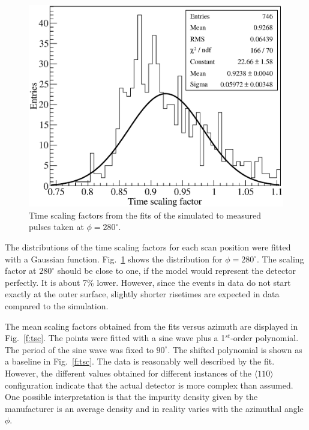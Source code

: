 \documentclass[epj]{svjour}
\begin{document}
\begin{figure}[htbp]
\centering
\includegraphics[width=0.9\linewidth]{tscale280}
\caption{Time scaling factors from the fits of the simulated to
measured pulses taken at $\phi=280^{\circ}$.}
\label{f:ts280}
\end{figure}

The distributions of the time scaling factors for each scan position
were fitted with a Gaussian function. Fig.~\ref{f:ts280} shows the
distribution for $\phi = 280^{\circ}$. The scaling factor at
$280^{\circ}$ should be close to one, if the model would represent the
detector perfectly. It is about 7\% lower. However, since the events
in data do not start exactly at the outer surface, slightly shorter
risetimes are expected in data compared to the simulation.

The mean scaling factors obtained from the fits versus azimuth are
displayed in Fig.~\ref{f:tsc}. The points were fitted with a sine wave
plus a 1$^{st}$-order polynomial. The period of the sine wave was
fixed to $90^{\circ}$. The shifted polynomial is shown as a baseline
in Fig.~\ref{f:tsc}. The data is reasonably well described by the
fit. However, the different values obtained for different instances of
the $\langle 110 \rangle$ configuration indicate that the actual
detector is more complex than assumed. One possible interpretation is
that the impurity density given by the manufacturer is an average
density and in reality varies with the azimuthal angle $\phi$.
\end{document}
